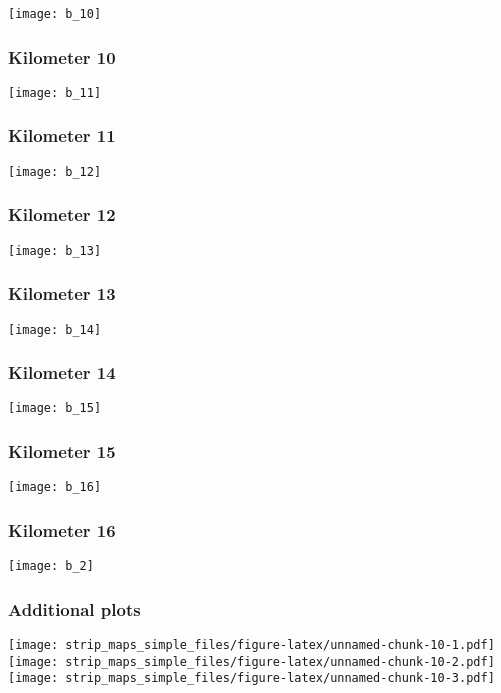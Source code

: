 \documentclass[]{article}
\begin{document}
\texttt{[image: b\_10]}

\subsubsection{Kilometer 10}\label{kilometer-10-1}

\texttt{[image: b\_11]}

\subsubsection{Kilometer 11}\label{kilometer-11}

\texttt{[image: b\_12]}

\subsubsection{Kilometer 12}\label{kilometer-12}

\texttt{[image: b\_13]}

\subsubsection{Kilometer 13}\label{kilometer-13}

\texttt{[image: b\_14]}

\subsubsection{Kilometer 14}\label{kilometer-14}

\texttt{[image: b\_15]}

\subsubsection{Kilometer 15}\label{kilometer-15}

\texttt{[image: b\_16]}

\subsubsection{Kilometer 16}\label{kilometer-16}

\texttt{[image: b\_2]}

\subsubsection{Additional plots}\label{additional-plots-1}

\texttt{[image: strip\_maps\_simple\_files/figure-latex/unnamed-chunk-10-1.pdf]}
\texttt{[image: strip\_maps\_simple\_files/figure-latex/unnamed-chunk-10-2.pdf]}
\texttt{[image: strip\_maps\_simple\_files/figure-latex/unnamed-chunk-10-3.pdf]}
\end{document}
